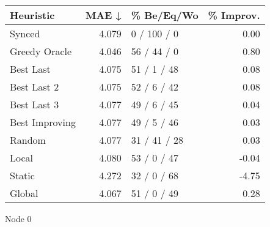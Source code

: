 \begin{tabular}{lrlr}
\toprule
\textbf{Heuristic} & \textbf{MAE ↓} & \textbf{\% Be/Eq/Wo} & \textbf{\% Improv.} \\
\midrule
            Synced &          4.079 &          0 / 100 / 0 &                0.00 \\
     Greedy Oracle &          4.046 &          56 / 44 / 0 &                0.80 \\
         Best Last &          4.075 &          51 / 1 / 48 &                0.08 \\
       Best Last 2 &          4.075 &          52 / 6 / 42 &                0.08 \\
       Best Last 3 &          4.077 &          49 / 6 / 45 &                0.04 \\
    Best Improving &          4.077 &          49 / 5 / 46 &                0.03 \\
            Random &          4.077 &         31 / 41 / 28 &                0.03 \\
             Local &          4.080 &          53 / 0 / 47 &               -0.04 \\
            Static &          4.272 &          32 / 0 / 68 &               -4.75 \\
            Global &          4.067 &          51 / 0 / 49 &                0.28 \\
\bottomrule
\end{tabular}
\caption{Node 0}
\label{tab:hr_non_lr01_le1_bs4_0}
